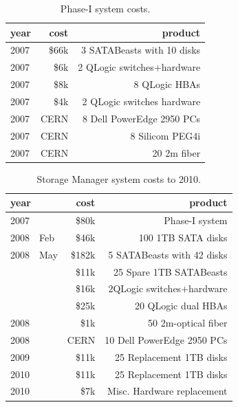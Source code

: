 \begin{table}[!ht]
\begin{center}
\begin{tabular}{l|r|r}
year & cost    & product \\\hline\hline
2007 & \$66k   & 3 SATABeasts with 10 disks  \\\hline
2007 & \$6k    & 2 QLogic switches$+$hardware  \\\hline
2007 & \$8k    & 8 QLogic HBAs \\\hline
2007 & \$4k    & 2 QLogic switches hardware \\\hline
2007 & CERN    & 8 Dell PowerEdge 2950 PCs\\\hline
2007 & CERN    & 8 Silicom PEG4i \\\hline
2007 & CERN    & 20 2m fiber \\\hline\hline
\end{tabular}
\caption{Phase-I system costs.}
\label{tab:proto}
\end{center}
\end{table}


\begin{table}[!ht]
\begin{center}
\begin{tabular}{l|r|r}
year  & cost      & product \\\hline\hline
2007  &     \$80k & Phase-I system \\ \hline\hline
2008~~Feb&  \$46k & 100 1TB  SATA disks  \\\hline
2008~~May& \$182k & 5 SATABeasts with 42 disks  \\
         &  \$11k & 25 Spare 1TB SATABeasts \\
         &  \$16k & 2QLogic switches$+$hardware  \\ 
         &  \$25k & 20 QLogic dual HBAs \\\hline
2008     &   \$1k & 50 2m-optical fiber \\\hline
2008     & CERN   & 10 Dell PowerEdge 2950 PCs \\\hline
\hline
2009     &  \$11k & 25 Replacement 1TB disks \\ \hline
\hline
2010     &  \$11k & 25 Replacement 1TB disks \\ \hline
2010     &   \$7k & Misc. Hardware replacement  \\  \hline
\end{tabular}
\caption{Storage Manager system costs to 2010.}
\label{tab:costs}
\end{center}
\end{table}


